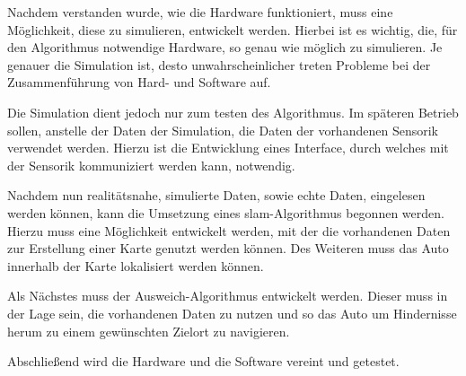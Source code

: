 Nachdem verstanden wurde, wie die Hardware funktioniert, muss eine Möglichkeit, diese zu simulieren, entwickelt werden.
Hierbei ist es wichtig, die, für den Algorithmus notwendige Hardware, so genau wie möglich zu simulieren. 
Je genauer die Simulation ist, desto unwahrscheinlicher treten Probleme bei der Zusammenführung von Hard- und Software auf.

Die Simulation dient jedoch nur zum testen des Algorithmus.
Im späteren Betrieb sollen, anstelle der Daten der Simulation, die Daten der vorhandenen Sensorik verwendet werden.
Hierzu ist die Entwicklung eines Interface, durch welches mit der Sensorik kommuniziert werden kann, notwendig.

Nachdem nun realitätsnahe, simulierte Daten, sowie echte Daten, eingelesen werden können, kann die Umsetzung eines \acf{slam}-Algorithmus begonnen werden.
Hierzu muss eine Möglichkeit entwickelt werden, mit der die vorhandenen Daten zur Erstellung einer Karte genutzt werden können.
Des Weiteren muss das Auto innerhalb der Karte lokalisiert werden können.

Als Nächstes muss der Ausweich-Algorithmus entwickelt werden.
Dieser muss in der Lage sein, die vorhandenen Daten zu nutzen und so das Auto um Hindernisse herum zu einem gewünschten Zielort zu navigieren.

Abschließend wird die Hardware und die Software vereint und getestet.

\newpage
